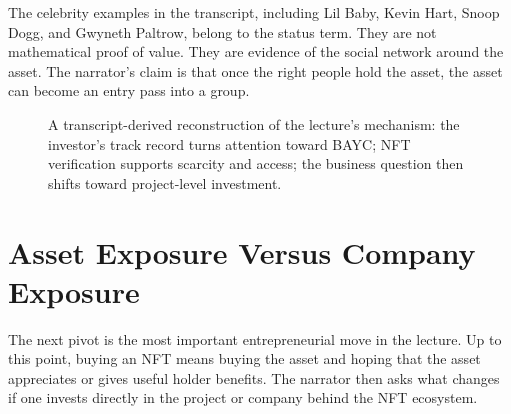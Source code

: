 The celebrity examples in the transcript, including Lil Baby, Kevin Hart, Snoop Dogg, and Gwyneth Paltrow, belong to the status term. They are not mathematical proof of value. They are evidence of the social network around the asset. The narrator's claim is that once the right people hold the asset, the asset can become an entry pass into a group.

\begin{figure}
\centering
{}
\caption{A transcript-derived reconstruction of the lecture's mechanism: the investor's track record turns attention toward BAYC; NFT verification supports scarcity and access; the business question then shifts toward project-level investment.}
\end{figure}

\section{Asset Exposure Versus Company Exposure}

The next pivot is the most important entrepreneurial move in the lecture. Up to this point, buying an NFT means buying the asset and hoping that the asset appreciates or gives useful holder benefits. The narrator then asks what changes if one invests directly in the project or company behind the NFT ecosystem.

